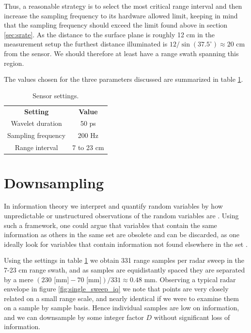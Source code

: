 Thus, a reasonable strategy is to select the most critical range interval and then increase the sampling frequency to its hardware allowed limit, keeping in mind that the sampling frequency should exceed the limit found above in section \ref{sec:srate}. As the distance to the surface plane is roughly 12 cm in the measurement setup the furthest distance illuminated is $12/\sin(37.5^\circ)\approx 20$ cm from the sensor. We should therefore at least have a range swath spanning this region. 

The values chosen for the three parameters discussed are summarized in table \ref{tab:sensor_settings}.

\begin{table}
\begin{center}
	\begin{tabular}{|c|c|}
	  	\hline
	  	\cellcolor{gray!150}\color{white}\textbf{Setting} & \cellcolor{gray!150}\color{white}\textbf{Value} \\
	 	 Wavelet duration & 50 ps \\
	  	\cellcolor{gray!25}Sampling frequency & \cellcolor{gray!25}200 Hz \\
	  	Range interval & 7 to 23 cm \\ 
		\hline
  	\end{tabular}	
\end{center}
\caption{Sensor settings.}
\label{tab:sensor_settings}
\end{table}

\section{Downsampling}
\label{downsampling}

In information theory we interpret and quantify random variables by how unpredictable or unstructured observations of the random variables are \citep{anderson_johnnesson_2006}. Using such a framework, one could argue that variables that contain the same information as others in the same set are obsolete and can be discarded, as one ideally look for variables that contain information not found elsewhere in the set \citep{hyvasrinen_karhunen_oja_2004}.

Using the settings in table \ref{tab:sensor_settings} we obtain 331 range samples per radar sweep in the 7-23 cm range swath, and as samples are equidistantly spaced they are separated by a mere $(230 \text{ [mm]}-70\text{ [mm]})/331\approx0.48$ mm. Observing a typical radar envelope in figure \ref{fig:single_sweep_iq} we note that points are very closely related on a small range scale, and nearly identical if we were to examine them on a sample by sample basis. Hence individual samples are low on information, and we can downsample by some integer factor $D$ without significant loss of information.

